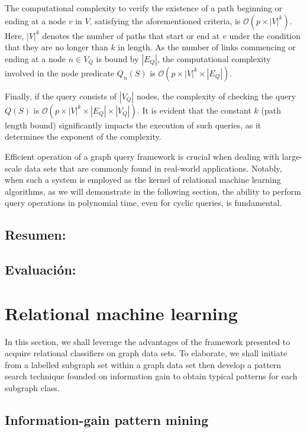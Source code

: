 \documentclass{article}%
\begin{document}
The computational complexity to verify the existence of a path beginning or ending at a node $v$ in $V$, satisfying the aforementioned criteria, is $\mathcal{O}(p \times |V|^k)$. Here, $|V|^k$ denotes the number of paths that start or end at $v$ under the condition that they are no longer than $k$ in length. As the number of links commencing or ending at a node $n \in V_Q$ is bound by $|E_Q|$, the computational complexity involved in the node predicate $Q_n(S)$ is $\mathcal{O}(p\times |V|^k \times |E_Q|)$. 

Finally, if the query consists of $|V_Q|$ nodes, the complexity of checking the query $Q(S)$ is $\mathcal{O}(p\times |V|^k \times |E_Q| \times |V_Q|)$. It is evident that the constant $k$ (path length bound) significantly impacts the execution of such queries, as it determines the exponent of the complexity.

Efficient operation of a graph query framework is crucial when dealing with large-scale data sets that are commonly found in real-world applications. Notably, when such a system is employed as the kernel of relational machine learning algorithms, as we will demonstrate in the following section, the ability to perform query operations in polynomial time, even for cyclic queries, is fundamental.%
\subsection{Resumen:}%
\label{subsec:Resumen}%

%
\subsection{Evaluación:}%
\label{subsec:Evaluacin}%

%
\clearpage%
\section{Relational machine learning}
\label{rml}

In this section, we shall leverage the advantages of the framework presented to acquire relational classifiers on graph data sets. To elaborate, we shall initiate from a labelled subgraph set within a graph data set then develop a pattern search technique founded on information gain to obtain typical patterns for each subgraph class.

\subsection{Information-gain pattern mining}
\label{algorithm}
\end{document}
